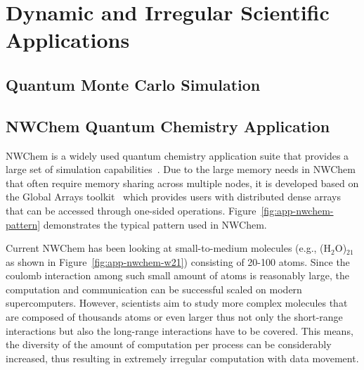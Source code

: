 \section{Dynamic and Irregular Scientific Applications}\label{sec:back-apps}

\subsection{Quantum Monte Carlo Simulation }
\cite{qmcpack}

\subsection{NWChem Quantum Chemistry Application}
NWChem is a widely used quantum chemistry application suite that provides
a large set of simulation capabilities~\cite{nwchem}. Due to the large
memory needs in NWChem that often require memory sharing across multiple
nodes, it is developed based on the Global Arrays toolkit~\cite{GA_SC94}
which provides users with distributed dense arrays that can be accessed
through one-sided operations. Figure~\ref{fig:app-nwchem-pattern}
demonstrates the typical  pattern used in NWChem.

Current NWChem has been looking at small-to-medium molecules (e.g.,
(H$_2$O)$_{21}$ as shown in Figure~\ref{fig:app-nwchem-w21}) consisting of
20-100 atoms. Since the coulomb interaction among such small amount of
atoms is reasonably large, the computation and communication can be
successful scaled on modern supercomputers. However, scientists aim to
study more complex molecules that are composed of thousands atoms or even
larger thus not only the short-range interactions but also the long-range
interactions have to be covered. This means, the diversity of the amount
of computation per process can be considerably increased, thus resulting
in extremely irregular computation with data movement.


